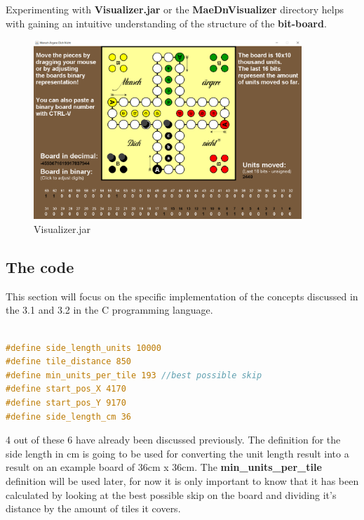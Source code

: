 \documentclass[12pt]{article}
\begin{document}
Experimenting with \textbf{Visualizer.jar} or the \textbf{MaeDnVisualizer} directory helps with gaining an intuitive understanding of the structure of the \textbf{bit-board}.

\begin{figure}[htbp]
    \centering
    \includegraphics[width=0.9\textwidth]{images/Figure6}
    \caption{Visualizer.jar}
    \label{fig:visualizer}
\end{figure}

\newpage

\subsection{The code}

This section will focus on the specific implementation of the concepts discussed in the 3.1 and 3.2 in the C programming language.

\begin{lstlisting}[language=C, caption={Distance definitions}, label={lst:distance-defs}]

#define side_length_units 10000
#define tile_distance 850
#define min_units_per_tile 193 //best possible skip
#define start_pos_X 4170
#define start_pos_Y 9170
#define side_length_cm 36

\end{lstlisting}

4 out of these 6 have already been discussed previously. The definition for the side length in cm is going to be used for converting the unit length result into a result on an example board of 36cm x 36cm. The \textbf{min\_units\_per\_tile} definition will be used later, for now it is only important to know that it has been calculated by looking at the best possible skip on the board and dividing it's distance by the amount of tiles it covers.
\end{document}
